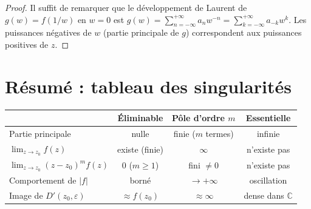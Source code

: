 \documentclass[12pt,a4paper,openany]{book}
\theoremstyle{definition}
\theoremstyle{plain}
\theoremstyle{remark}
\newcommand{\C}{\mathbb{C}}
\newcommand{\abs}[1]{\left|#1\right|}
\begin{document}
\begin{proof}
Il suffit de remarquer que le développement de Laurent de
$g(w) = f(1/w)$ en $w = 0$ est
$g(w) = \sum_{n=-\infty}^{+\infty} a_n w^{-n}
= \sum_{k=-\infty}^{+\infty} a_{-k} w^k$.
Les puissances négatives de $w$ (partie principale de $g$) correspondent
aux puissances positives de $z$.
\end{proof}

\section{Résumé : tableau des singularités}

\begin{center}
\renewcommand{\arraystretch}{1.6}
\begin{tabular}{@{}lccc@{}}
\toprule
& \textbf{Éliminable} & \textbf{Pôle d'ordre $m$} & \textbf{Essentielle} \\
\midrule
Partie principale & nulle & finie ($m$ termes) & infinie \\
$\lim_{z \to z_0} f(z)$ & existe (finie) & $\infty$ & n'existe pas \\
$\lim_{z \to z_0}(z-z_0)^m f(z)$ & $0$ ($m \geq 1$)
  & fini $\neq 0$ & n'existe pas \\
Comportement de $\abs{f}$ & borné & $\to +\infty$
  & oscillation \\
Image de $D'(z_0,\varepsilon)$ & $\approx f(z_0)$
  & $\approx \infty$ & dense dans $\C$ \\
\bottomrule
\end{tabular}
\end{center}
\end{document}

